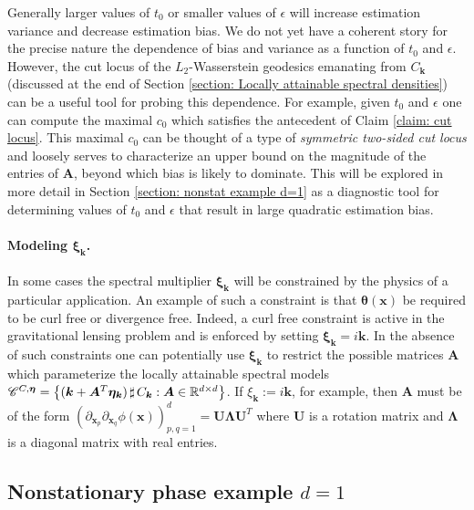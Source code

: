 \documentclass[10pt,noinfoline]{imsart}
\newcommand{\bs}{\boldsymbol}
\begin{document}
Generally larger values of $t_0$ or smaller values of $\epsilon$ will increase estimation variance and decrease estimation bias. We do not yet have a coherent story for the precise nature the dependence of bias and variance as a function of $t_0$ and $\epsilon$. However,  the cut locus of the $L_2$-Wasserstein geodesics emanating from $C_{\bs k}$  (discussed at the end of Section \ref{section: Locally attainable spectral densities}) can be a useful tool for probing this dependence. For example, given $t_0$ and $\epsilon$ one can compute the maximal $c_0$ which satisfies the antecedent of Claim \ref{claim: cut locus}. This maximal $c_0$ can be thought of a type of \textit{symmetric two-sided cut locus} and loosely serves to characterize an upper bound on the magnitude of the entries of $\bs A$, beyond which bias is likely to dominate. 
This will be explored in more detail in Section \ref{section: nonstat example d=1} as a diagnostic tool for determining values of  $t_0$ and $\epsilon$ that result in  large quadratic estimation bias. 




\paragraph{Modeling $\bs \xi_{\bs k}$.} In some cases the spectral multiplier $\bs \xi_{\bs k}$ will be constrained by the physics of a particular application. An example of such a constraint is that $\bs \theta(\bs x)$ be required to be curl free or divergence free. Indeed, a curl free constraint is active in the gravitational lensing problem and is enforced by setting $\bs \xi_{\bs k}=i\bs k$. In the absence of such constraints one can potentially use $\bs \xi_{\bs k}$ to restrict the possible matrices $\bs A$ which parameterize  the locally attainable spectral models  $\mathscr C^{C,\bs\eta}= \big\{ (\bs k+ \bs A^T \bs\eta_{\bs k})\,\sharp\, C_{\bs k}: \bs A \in \Bbb R^{d\times d}\big\}$.   If $\xi_{\bs k}:= i\bs k$, for example, then $\bs A$ must be of the form $(\partial_{\bs x_p}\partial_{\bs x_q}\phi(\bs x))_{p,q=1}^d = \bs U\bs \Lambda \bs U^T$ where $\bs U$ is a rotation matrix and $\bs \Lambda$ is a diagonal matrix with real entries. 


\subsection{Nonstationary phase example $d=1$}
\end{document}
